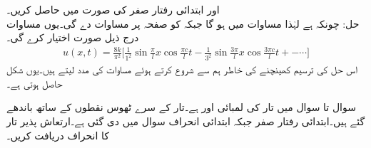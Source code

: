 اور ابتدائی رفتار صفر  کی صورت میں حاصل کریں۔\\
حل: چونکہ  ہے لہٰذا مساوات  میں  ہو گا جبکہ  کو صفحہ  پر مساوات  دے گی۔یوں  مساوات  درج ذیل صورت اختیار کرے گی۔
\begin{align*}
u(x,t)=\frac{8k}{\pi^2}\big[\frac{1}{1^2}\sin \frac{\pi}{l}x\cos\frac{\pi c}{l}t-\frac{1}{3^2}\sin \frac{3\pi}{l}x\cos\frac{3\pi c}{l}t+-\cdots\big]
\end{align*}
اس حل کی ترسیم کھینچنے کی خاطر ہم  سے شروع کرتے ہوئے مساوات  کی مدد لیتے ہیں۔یوں شکل  حاصل ہوتی ہے۔

سوال  تا سوال  میں تار کی لمبائی  اور  ہے۔تار کے سرے ٹھوس نقطوں کے ساتھ باندھے گئے ہیں۔ابتدائی رفتار صفر جبکہ ابتدائی انحراف  سوال میں دی گئی ہے۔ارتعاش پذیر تار کا انحراف  دریافت کریں۔

